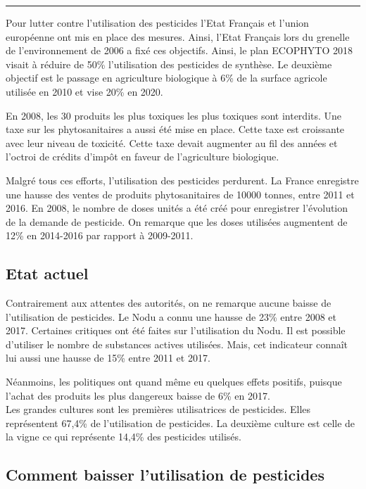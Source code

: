 \documentclass[11pt,]{article}
\begin{document}
\noindent

\rule[0.5ex]{\linewidth}{1pt}

Pour lutter contre l'utilisation des pesticides l'Etat Français et
l'union européenne ont mis en place des mesures. Ainsi, l'Etat Français
lors du grenelle de l'environnement de 2006 a fixé ces objectifs. Ainsi,
le plan ECOPHYTO 2018 visait à réduire de 50\% l'utilisation des
pesticides de synthèse. Le deuxième objectif est le passage en
agriculture biologique à 6\% de la surface agricole utilisée en 2010 et
vise 20\% en 2020.

En 2008, les 30 produits les plus toxiques les plus toxiques sont
interdits. Une taxe sur les phytosanitaires a aussi été mise en place.
Cette taxe est croissante avec leur niveau de toxicité. Cette taxe
devait augmenter au fil des années et l'octroi de crédits d'impôt en
faveur de l'agriculture biologique.

Malgré tous ces efforts, l'utilisation des pesticides perdurent. La
France enregistre une hausse des ventes de produits phytosanitaires de
10000 tonnes, entre 2011 et 2016. En 2008, le nombre de doses unités a
été créé pour enregistrer l'évolution de la demande de pesticide. On
remarque que les doses utilisées augmentent de 12\% en 2014-2016 par
rapport à 2009-2011.

\hypertarget{etat-actuel}{%
\subsection{Etat actuel}\label{etat-actuel}}

Contrairement aux attentes des autorités, on ne remarque aucune baisse
de l'utilisation de pesticides. Le Nodu a connu une hausse de 23\% entre
2008 et 2017. Certaines critiques ont été faites sur l'utilisation du
Nodu. Il est possible d'utiliser le nombre de substances actives
utilisées. Mais, cet indicateur connaît lui aussi une hausse de 15\%
entre 2011 et 2017.

Néanmoins, les politiques ont quand même eu quelques effets positifs,
puisque l'achat des produits les plus dangereux baisse de 6\% en 2017.\\
Les grandes cultures sont les premières utilisatrices de pesticides.
Elles représentent 67,4\% de l'utilisation de pesticides. La deuxième
culture est celle de la vigne ce qui représente 14,4\% des pesticides
utilisés.

\hypertarget{comment-baisser-lutilisation-de-pesticides}{%
\subsection{Comment baisser l'utilisation de
pesticides}\label{comment-baisser-lutilisation-de-pesticides}}
\end{document}

